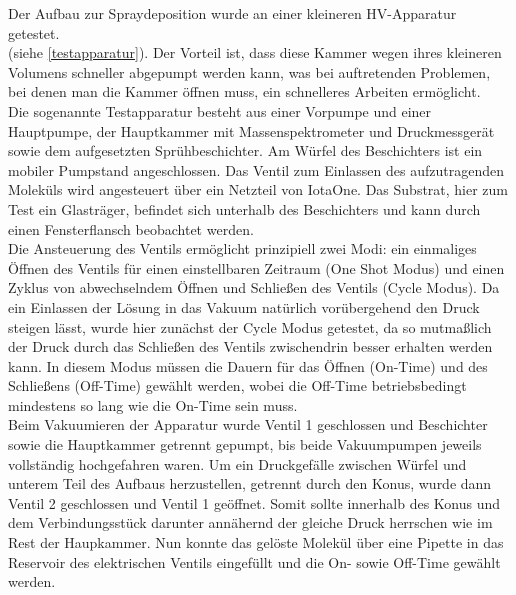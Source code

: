 Der Aufbau zur Spraydeposition wurde an einer kleineren HV-Apparatur getestet. \\(siehe
\ref{testapparatur}).
Der
Vorteil ist, dass diese Kammer wegen ihres kleineren Volumens schneller abgepumpt werden kann, was bei
auftretenden Problemen, bei denen man die Kammer öffnen muss, ein schnelleres Arbeiten ermöglicht.\\
Die sogenannte Testapparatur besteht aus einer Vorpumpe und  einer Hauptpumpe,
der Hauptkammer mit Massenspektrometer und Druckmessgerät sowie dem aufgesetzten
Sprühbeschichter. Am Würfel des Beschichters ist ein mobiler Pumpstand angeschlossen. Das Ventil
zum Einlassen des aufzutragenden Moleküls wird angesteuert über ein Netzteil von IotaOne. Das
Substrat, hier zum Test ein Glasträger, befindet sich unterhalb des Beschichters und kann durch einen
Fensterflansch beobachtet werden.\\
Die Ansteuerung des Ventils ermöglicht
prinzipiell zwei Modi: ein einmaliges Öffnen des
Ventils für einen einstellbaren Zeitraum (One
Shot Modus) und einen Zyklus von abwechselndem
Öffnen und Schließen des Ventils (Cycle Modus).
Da ein Einlassen der Lösung in das Vakuum
natürlich vorübergehend den Druck steigen lässt, wurde hier
zunächst der Cycle Modus getestet, da so
mutmaßlich der Druck durch das Schließen des
Ventils zwischendrin besser erhalten werden
kann. In diesem Modus müssen die Dauern für das
Öffnen (On-Time) und des Schließens (Off-Time)
gewählt werden, wobei die Off-Time
betriebsbedingt mindestens so lang wie die
On-Time sein muss.\\
Beim Vakuumieren der Apparatur wurde Ventil 1
 geschlossen und Beschichter sowie die 
 Hauptkammer getrennt gepumpt, bis beide
 Vakuumpumpen jeweils vollständig hochgefahren
 waren.
 Um ein Druckgefälle zwischen Würfel und unterem
 Teil des Aufbaus herzustellen, getrennt durch den
 Konus, wurde dann Ventil 2 geschlossen und
 Ventil 1 geöffnet.
 Somit sollte innerhalb des Konus und dem
 Verbindungsstück darunter annähernd der gleiche
 Druck herrschen wie im Rest der Haupkammer.
 Nun konnte das gelöste Molekül über eine Pipette
 in das Reservoir des elektrischen Ventils
 eingefüllt und die On- sowie Off-Time gewählt
 werden.\\
 
